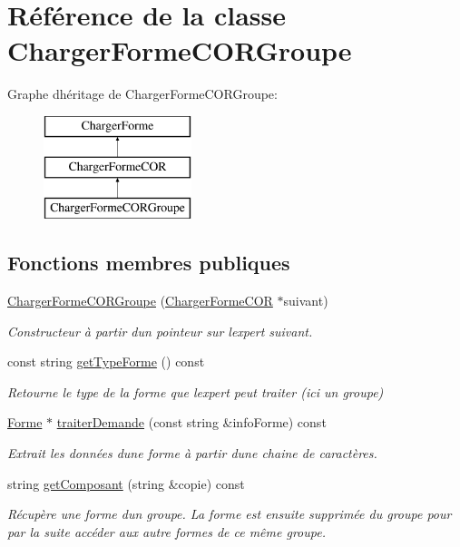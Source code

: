 \hypertarget{class_charger_forme_c_o_r_groupe}{}\section{Référence de la classe Charger\+Forme\+C\+O\+R\+Groupe}
\label{class_charger_forme_c_o_r_groupe}
Graphe d\textquotesingle{}héritage de Charger\+Forme\+C\+O\+R\+Groupe\+:\begin{figure}[H]
\begin{center}
\leavevmode
\includegraphics[height=3.000000cm]{class_charger_forme_c_o_r_groupe}
\end{center}
\end{figure}
\subsection*{Fonctions membres publiques}
\begin{DoxyCompactItemize}
\item 
\mbox{\hyperlink{class_charger_forme_c_o_r_groupe_a8af20b68260a8e445aeb0163631f6a66}{Charger\+Forme\+C\+O\+R\+Groupe}} (\mbox{\hyperlink{class_charger_forme_c_o_r}{Charger\+Forme\+C\+OR}} $\ast$suivant)
\begin{DoxyCompactList}\small\item\em Constructeur à partir d\textquotesingle{}un pointeur sur l\textquotesingle{}expert suivant. \end{DoxyCompactList}\item 
const string \mbox{\hyperlink{class_charger_forme_c_o_r_groupe_a202dfd1ec95bc7a20daeb66a92452a11}{get\+Type\+Forme}} () const
\begin{DoxyCompactList}\small\item\em Retourne le type de la forme que l\textquotesingle{}expert peut traiter (ici un groupe) \end{DoxyCompactList}\item 
\mbox{\hyperlink{class_forme}{Forme}} $\ast$ \mbox{\hyperlink{class_charger_forme_c_o_r_groupe_ab28f5a9e7a8fe306c98aa3f1f8b775e4}{traiter\+Demande}} (const string \&info\+Forme) const
\begin{DoxyCompactList}\small\item\em Extrait les données d\textquotesingle{}une forme à partir d\textquotesingle{}une chaine de caractères. \end{DoxyCompactList}\item 
string \mbox{\hyperlink{class_charger_forme_c_o_r_groupe_a6a9f6502bd3d05670a69c8eca418ce06}{get\+Composant}} (string \&copie) const
\begin{DoxyCompactList}\small\item\em Récupère une forme d\textquotesingle{}un groupe. La forme est ensuite supprimée du groupe pour par la suite accéder aux autre formes de ce même groupe. \end{DoxyCompactList}\end{DoxyCompactItemize}
